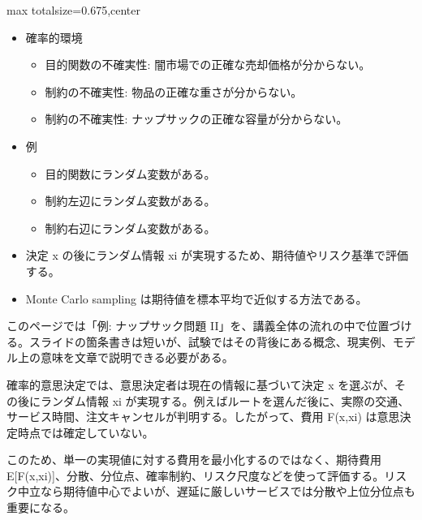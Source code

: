 \clearpage
{}
\begin{adjustbox}{max totalsize={\textwidth}{0.675\textheight},center}
\begin{minipage}{\textwidth}\scriptsize
\begin{minipage}[t]{0.485\textwidth}
\begin{itemize}
\item 確率的環境
\begin{itemize}
\item 目的関数の不確実性: 闇市場での正確な売却価格が分からない。
\item 制約の不確実性: 物品の正確な重さが分からない。
\item 制約の不確実性: ナップサックの正確な容量が分からない。
\end{itemize}
\item 例
\begin{itemize}
\item 目的関数にランダム変数がある。
\item 制約左辺にランダム変数がある。
\item 制約右辺にランダム変数がある。
\end{itemize}
\end{itemize}
\begin{itemize}
\item 決定 x の後にランダム情報 xi が実現するため、期待値やリスク基準で評価する。
\item Monte Carlo sampling は期待値を標本平均で近似する方法である。
\end{itemize}
\end{minipage}\hfill
\begin{minipage}[t]{0.485\textwidth}
このページでは「例: ナップサック問題 II」を、講義全体の流れの中で位置づける。スライドの箇条書きは短いが、試験ではその背後にある概念、現実例、モデル上の意味を文章で説明できる必要がある。\par
確率的意思決定では、意思決定者は現在の情報に基づいて決定 x を選ぶが、その後にランダム情報 xi が実現する。例えばルートを選んだ後に、実際の交通、サービス時間、注文キャンセルが判明する。したがって、費用 F(x,xi) は意思決定時点では確定していない。\par
このため、単一の実現値に対する費用を最小化するのではなく、期待費用 E[F(x,xi)]、分散、分位点、確率制約、リスク尺度などを使って評価する。リスク中立なら期待値中心でよいが、遅延に厳しいサービスでは分散や上位分位点も重要になる。\par

\end{minipage}
\end{minipage}
\end{adjustbox}

